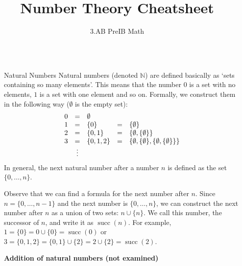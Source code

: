 \documentclass[final]{beamer}
\title{Number Theory Cheatsheet}
\author{3.AB PreIB Math}
\institute[shortinst]{Adam Klepáč and Jáchym Löwenhöffer}
\newlength{\sepwidth}
\newlength{\colwidth}
\newcommand{\separatorcolumn}{\begin{column}{\sepwidth}\end{column}}
\newcommand{\N}{\mathbb{N}}
\DeclareMathOperator{\s}{succ}
\begin{document}

\begin{frame}[t]
\begin{columns}[t]
\separatorcolumn

\begin{column}{\colwidth}

 \begin{exampleblock}{Natural Numbers}
  Natural numbers (denoted $\N$) are defined basically as `sets containing so
  many elements'. This means that the number $0$ is a set with no elements, $1$
  is a set with one element and so on. Formally, we construct them in the
  following way ($\emptyset$ is the empty set):
  \[
   \begin{array}{r c l c l}
    0 & = & \emptyset & &\\
    1 & = & \{0\} & = & \{\emptyset\}\\
    2 & = & \{0, 1\} & = & \{\emptyset, \{\emptyset\}\}\\
    3 & = & \{0, 1, 2\} & = & \{\emptyset, \{\emptyset\}, \{\emptyset,
    \{\emptyset\}\}\}\\
      & \vdots & & & 
   \end{array}
  \]
  In general, the \alert{next natural number} after a number $n$ is defined as
  the set $\{0,\ldots,n\}$. 

  Observe that we can find a formula for the next number after $n$. Since $n =
  \{0,\ldots,n-1\}$ and the next number is $\{0,\ldots,n\}$, we can construct
  the next number after $n$ as a union of two sets: $n \cup \{n\}$. We call this
  number, the \alert{successor} of $n$, and write it as \alert{$\s(n)$}. For
  example, $1 = \{0\} = 0 \cup \{0\} = \s(0)$ or $3 = \{0,1,2\} = \{0,1\} \cup
  \{2\} = 2 \cup \{2\} = \s(2)$.

  \vspace{18pt}

  \textbf{\large Addition of natural numbers (\alert{not examined})}


\end{exampleblock}
\end{column}
\end{columns}
\end{frame}
\end{document}
